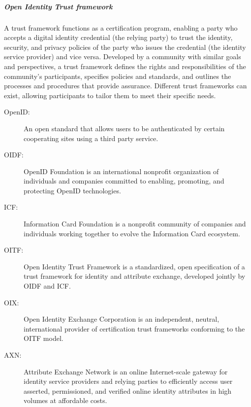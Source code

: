 \documentclass{article}
\begin{document}
                                    \subparagraph{Open Identity Trust framework}
                                    A trust framework functions as a certification program, enabling a party who accepts a digital identity credential (the relying party) to trust the identity, security, and privacy policies of the party who issues the credential (the identity service provider) and vice versa. Developed by a community with similar goals and perspectives, a trust framework defines the rights and responsibilities of the community's participants, specifies policies and standards, and outlines the processes and procedures that provide assurance. Different trust frameworks can exist, allowing participants to tailor them to meet their specific needs.

                                    \begin{description}
                                        \item[OpenID:] 
                                        An open standard that allows users to be authenticated by certain cooperating sites using a third party service.
                                        
                                        \item[OIDF:] 
                                        OpenID Foundation is an international nonprofit organization of individuals and companies committed to enabling, promoting, and protecting OpenID technologies.
                                        
                                        \item[ICF:] 
                                        Information Card Foundation is a nonprofit community of companies and individuals working together to evolve the Information Card ecosystem.
                                        
                                        \item[OITF:] 
                                        Open Identity Trust Framework is a standardized, open specification of a trust framework for identity and attribute exchange, developed jointly by OIDF and ICF.
                                        
                                        \item[OIX:] 
                                        Open Identity Exchange Corporation is an independent, neutral, international provider of certification trust frameworks conforming to the OITF model.
                                        
                                        \item[AXN:] 
                                        Attribute Exchange Network is an online Internet-scale gateway for identity service providers and relying parties to efficiently access user asserted, permissioned, and verified online identity attributes in high volumes at affordable costs.
                                    \end{description}
                                    
\end{document}
